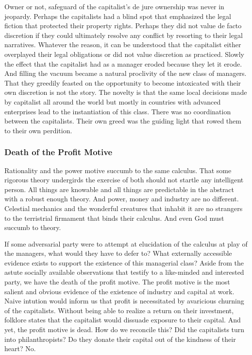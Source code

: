 \documentclass[12pt]{article}
\begin{document}
Owner or not, safeguard of the capitalist's de jure ownership was never in jeopardy.
Perhaps the capitalists had a blind spot that emphasized the legal fiction that protected their property rights.
Perhaps they did not value de facto discretion if they could ultimately resolve any conflict by resorting to their legal narratives.
Whatever the reason, it can be understood that the capitalist either overplayed their legal obligations or did not value discretion as practiced.
Slowly the effect that the capitalist had as a manager eroded because they let it erode.
And filling the vacuum became a natural proclivity of the new class of managers.
That they greedily feasted on the opportunity to become intoxicated with their own discretion is not the story.
The novelty is that the same local decisions made by capitalist all around the world but mostly in countries with advanced enterprises lead to the instantiation of this class.
There was no coordination between the capitalists.
Their own greed was the guiding light that rowed them to their own perdition.


\subsubsection{Death of the Profit Motive}
Rationality and the power motive succumb to the same calculus.
That some rigorous theory undergirds the exercise of both should not startle any intelligent person.
All things are knowable and all things are predictable in the abstract with a robust enough theory.
And power, money and industry are no different.
Celestial mechanics and the wonderful creatures that inhabit it are no strangers to the terristrial firmament that binds their calculus.
And even God must succumb to theory.

If some adversarial party were to attempt at elucidation of the calculus at play of the managers, what would they have to defer to?
What externally accessible evidence exists to support the existence of this managerial class?
Aside from the astute socially available observations that testify to a like-minded and interested party, we have the death of the profit motive.
The profit motive is the most salient and obvious evidence of the existence of industry and capital at work.
Naive intution would inform us that profit is necessitated by avaricious churning of the capitalists.
Without being able to realize a return on their investment, folklore states that the capitalist would dissuade exposure to their capital.
And yet, the profit motive is dead.
How do we reconcile this?
Did the capitalists turn into philanthropists?
Do they donate their capital out of the kindness of their heart?
No.
\end{document}
